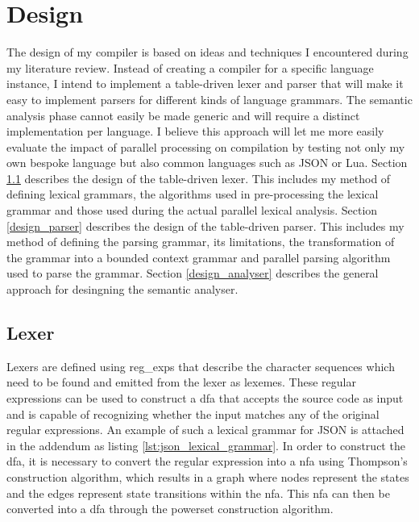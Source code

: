 \chapter{Design} \label{design}

The design of my compiler is based on ideas and techniques I encountered during
my literature review. Instead of creating a compiler for a specific language
instance, I intend to implement a table-driven lexer and parser that will
make it easy to implement parsers for different kinds of language grammars.
The semantic analysis phase cannot easily be made generic and will require a
distinct implementation per language. I believe this approach will let me more
easily evaluate the impact of parallel processing on compilation by testing not
only my own bespoke language but also common languages such as JSON or Lua.
\newline\newline
Section \ref{design_lexer} describes the design of the table-driven lexer.
This includes my method of defining lexical grammars, the algorithms used in
pre-processing the lexical grammar and those used during the actual parallel
lexical analysis.
\newline\newline
Section \ref{design_parser} describes the design of the table-driven parser.
This includes my method of defining the parsing grammar, its limitations,
the transformation of the grammar into a bounded context grammar and parallel
parsing algorithm used to parse the grammar.
\newline\newline
Section \ref{design_analyser} describes the general approach for desingning the
semantic analyser.

\section{Lexer} \label{design_lexer}

Lexers are defined using \glspl{reg_exp} that describe the character sequences
which need to be found and emitted from the lexer as lexemes. These regular
expressions can be used to construct a \gls{dfa} that accepts the source code
as input and is capable of recognizing whether the input matches any of the
original regular expressions. An example of such a lexical grammar for JSON is
attached in the addendum as listing \ref{lst:json_lexical_grammar}. In order
to construct the \gls{dfa}, it is necessary to convert the regular expression
into a \gls{nfa} using Thompson's construction algorithm, which results in a
graph where nodes represent the states and the edges represent state transitions
within the \gls{nfa}. This \gls{nfa} can then be converted into a \gls{dfa}
through the powerset construction algorithm.


